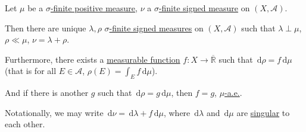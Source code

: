 \begin{theorem}\label{thm:Lebesgue-Radon-Nikodym-theorem}
	Let \(\mu\) be a \hyperref[def:finite-signed-measure]{\(\sigma\)-finite positive measure}, \(\nu\) a \hyperref[def:finite-signed-measure]{\(\sigma\)-finite signed measure}
	on \((X, \mathcal{A})\).

	Then there are unique \(\lambda,\rho\) \hyperref[def:finite-signed-measure]{\(\sigma\)-finite signed measures} on \((X, \mathcal{A})\) such that \(\lambda \perp \mu\),
	\(\rho \ll \mu\), \(\nu = \lambda + \rho\).

	Furthermore, there exists a \hyperref[def:measurable-function]{measurable function} \(f \colon X \to \overline{\mathbb{R}}\) such that \(\,\mathrm{d} \rho = f \,\mathrm{d} \mu\) (that is
	for all \(E \in \mathcal{A}\), \(\rho(E) = \int_E f \,\mathrm{d} \mu\)).

	And if there is another \(g\) such that \(\,\mathrm{d} \rho = g \,\mathrm{d} \mu\), then \(f = g\), \hyperref[def:mu-almost-everywhere]{\(\mu\)-a.e.}.

	Notationally, we may write \(\,\mathrm{d} \nu = \,\mathrm{d} \lambda + f \,\mathrm{d} \mu\), where \(\,\mathrm{d} \lambda\)
	and \(\,\mathrm{d} \mu\) are \hyperref[def:singular]{singular} to each other.
\end{theorem}

